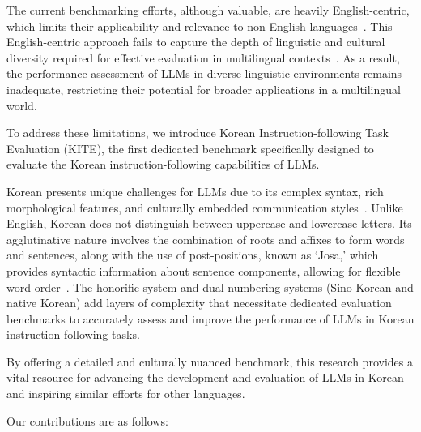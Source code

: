     The current benchmarking efforts, although valuable, are heavily English-centric, which limits their applicability and relevance to non-English languages~\cite{wang2018glue,hendrycks2020measuring,srivastava2022beyond,wang2024mmlu}. This English-centric approach fails to capture the depth of linguistic and cultural diversity required for effective evaluation in multilingual contexts~\cite{costa2022no,wang2023challenging,weber2024investigating}. As a result, the performance assessment of LLMs in diverse linguistic environments remains inadequate, restricting their potential for broader applications in a multilingual world.

    To address these limitations, we introduce Korean Instruction-following Task Evaluation (KITE), the first dedicated benchmark specifically designed to evaluate the Korean instruction-following capabilities of LLMs.

    Korean presents unique challenges for LLMs due to its complex syntax, rich morphological features, and culturally embedded communication styles~\cite{lee2015introduction,park2021should,park2021klue}. Unlike English, Korean does not distinguish between uppercase and lowercase letters. Its agglutinative nature involves the combination of roots and affixes to form words and sentences, along with the use of post-positions, known as `Josa,' which provides syntactic information about sentence components, allowing for flexible word order~\cite{park2014konlpy,park2020empirical,seo2023chef}. The honorific system and dual numbering systems (Sino-Korean and native Korean) add layers of complexity that necessitate dedicated evaluation benchmarks to accurately assess and improve the performance of LLMs in Korean instruction-following tasks.

    By offering a detailed and culturally nuanced benchmark, this research provides a vital resource for advancing the development and evaluation of LLMs in Korean and inspiring similar efforts for other languages.

    Our contributions are as follows:

